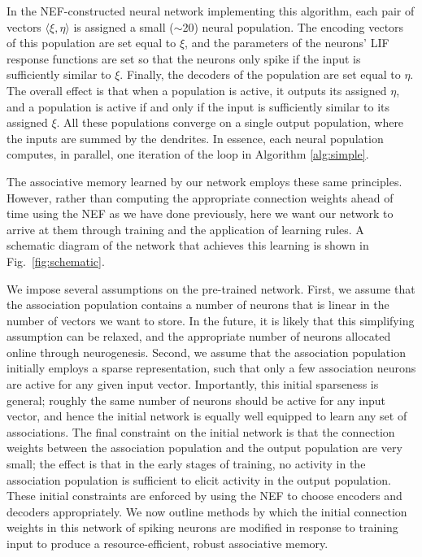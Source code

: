 \documentclass[10pt,letterpaper]{article}
\newcommand{\fg}{Fig.}
\begin{document}
In the NEF-constructed neural network implementing this algorithm, each pair of vectors $\langle\xi, \eta\rangle$ is assigned a small ($\sim$20) neural population. The encoding vectors of this population are set equal to $\xi$, and the parameters of the neurons' LIF response functions are set so that the neurons only spike if the input is sufficiently similar to $\xi$. Finally, the decoders of the population are set equal to $\eta$. The overall effect is that when a population is active, it outputs its assigned $\eta$, and a population is active if and only if the input is sufficiently similar to its assigned $\xi$. All these populations converge on a single output population, where the inputs are summed by the dendrites. In essence, each neural population computes, in parallel, one iteration of the loop in Algorithm \ref{alg:simple}.

The associative memory learned by our network employs these same principles. However, rather than computing the appropriate connection weights ahead of time using the NEF as we have done previously, here we want our network to arrive at them through training and the application of learning rules. A schematic diagram of the network that achieves this learning is shown in \fg~\ref{fig:schematic}. 

We impose several assumptions on the pre-trained network. First, we assume that the association population contains a number of neurons that is linear in the number of vectors we want to store. In the future, it is likely that this simplifying assumption can be relaxed, and the appropriate number of neurons allocated online through neurogenesis. Second, we assume that the association population initially employs a sparse representation, such that only a few association neurons are active for any given input vector. Importantly, this initial sparseness is general; roughly the same number of neurons should be active for any input vector, and hence the initial network is equally well equipped to learn any set of associations. The final constraint on the initial network is that the connection weights between the association population and the output population are very small; the effect is that in the early stages of training, no activity in the association population is sufficient to elicit activity in the output population. These initial constraints are enforced by using the NEF to choose encoders and decoders appropriately. We now outline methods by which the initial connection weights in this network of spiking neurons are modified in response to training input to produce a resource-efficient, robust associative memory.
\end{document}

